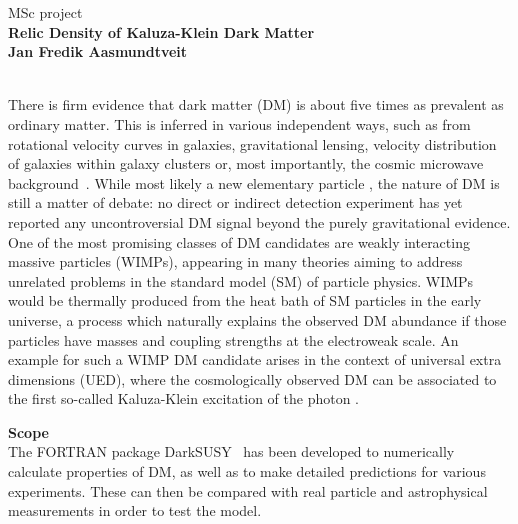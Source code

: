 \documentclass[12pt,a4paper]{article}
\newcommand{\ds}{{\sf DarkSUSY}}
\begin{document}
\pagestyle{plain}


 \vspace*{-1.5cm}

\thispagestyle{empty}

{\begin{center}
MSc project \\[1ex]
 {\large \bf  Relic Density of Kaluza-Klein Dark Matter}\\[0.5ex]
 {\scriptsize \bf Jan Fredik Aasmundtveit}
\end{center}
}
 \vspace*{0.5cm}

\\[-2ex]
 
 There is firm evidence that dark matter (DM) is about five times as prevalent as ordinary 
 matter. This is  inferred in various independent ways, such as from rotational  velocity curves in 
 galaxies, gravitational lensing, velocity distribution of galaxies within galaxy clusters
 or, most importantly, the cosmic microwave background~\cite{Ade:2013zuv}. While most
 likely a new elementary particle \cite{Bertone:2010zza}, the nature of DM is still a matter of debate: 
 no direct or indirect detection experiment has yet reported any uncontroversial DM signal
beyond the purely gravitational evidence.
One of the most promising classes of DM candidates are weakly interacting massive particles (WIMPs), appearing in 
many theories 
aiming to address unrelated problems in the standard model (SM) of particle physics. WIMPs would be thermally 
produced from the
heat bath of SM particles in the early universe, a process which naturally explains the observed DM abundance if 
those particles have masses and coupling strengths at the electroweak scale.
An example for such a WIMP DM candidate arises in the context of  universal extra dimensions (UED),
where the cosmologically observed DM can be associated to the first so-called Kaluza-Klein excitation of the photon
\cite{Servant:2002aq}.


 
\vspace*{0.6cm}
\noindent
{\bf Scope}\\[-2ex]

The FORTRAN package \ds\ \cite{ds} has been developed to numerically calculate 
properties of DM, as well as to make 
detailed predictions for various experiments.
These can then be compared with real particle and astrophysical measurements in order to test the 
model. 
\end{document}
